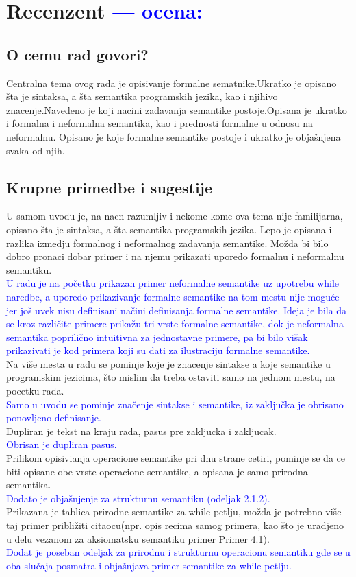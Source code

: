 \documentclass[a4paper]{report}
\newcommand{\odgovor}[1]{\textcolor{blue}{#1}}
\begin{document}
\chapter{Recenzent \odgovor{--- ocena:} }


\section{O cemu rad govori?}

Centralna tema ovog rada je  opisivanje formalne sematnike.Ukratko je opisano šta je sintaksa, a šta semantika programskih jezika, kao i njihivo znacenje.Navedeno je koji nacini zadavanja semantike postoje.Opisana je ukratko i formalna i neformalna semantika, kao i prednosti formalne u odnosu na neformalnu. Opisano je koje formalne semantike postoje i ukratko je objašnjena svaka od njih. 


\section{Krupne primedbe i sugestije}

U samom uvodu je, na nacn razumljiv i nekome kome ova tema nije familijarna, opisano šta je sintaksa, a šta semantika programskih jezika. Lepo je opisana i razlika izmedju formalnog i neformalnog zadavanja semantike. Možda bi bilo dobro pronaci dobar primer i na njemu prikazati uporedo formalnu i neformalnu semantiku.\\
\odgovor{U radu je na početku prikazan primer neformalne semantike uz upotrebu while naredbe, a uporedo prikazivanje formalne semantike na tom mestu nije moguće jer još uvek nisu definisani načini definisanja formalne semantike. Ideja je bila da se kroz različite primere prikažu tri vrste formalne semantike, dok je neformalna semantika poprilično intuitivna za jednostavne primere, pa bi bilo višak prikazivati je kod primera koji su dati za ilustraciju formalne semantike.}\\
 Na više mesta u radu se pominje koje je znacenje sintakse a koje semantike u programskim jezicima, što mislim da treba ostaviti samo na jednom mestu, na pocetku rada. \\
\odgovor{Samo u uvodu se pominje značenje sintakse i semantike, iz zaključka je obrisano ponovljeno definisanje.}\\
Dupliran je tekst na kraju rada, pasus pre zakljucka i zakljucak. \\
\odgovor{Obrisan je dupliran pasus.}\\
Prilikom opisivianja operacione semantike pri dnu strane cetiri, pominje se da ce biti opisane obe vrste operacione semantike, a opisana je samo prirodna  semantika.\\
\odgovor{Dodato je objašnjenje za strukturnu semantiku (odeljak 2.1.2).}\\
 Prikazana je tablica prirodne semantike za while petlju, možda je potrebno više taj primer približiti citaocu(npr. opis recima samog primera, kao što je uradjeno u delu vezanom za aksiomatsku semantiku primer Primer 4.1).    
\\
\odgovor{Dodat je poseban odeljak za prirodnu i strukturnu operacionu semantiku gde se u oba slučaja posmatra i objašnjava primer semantike za while petlju.}\\
\end{document}
